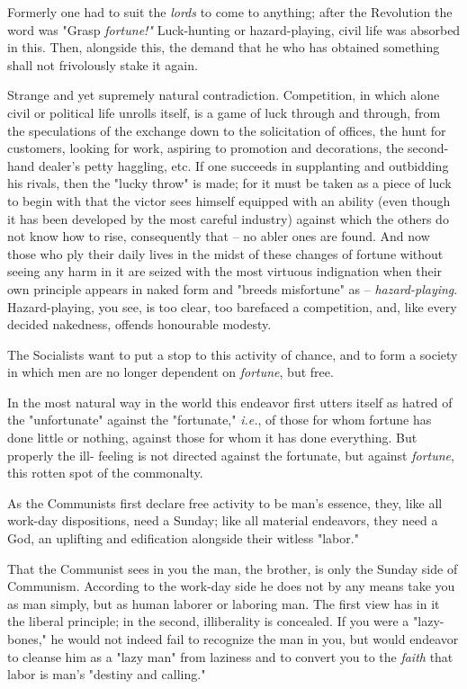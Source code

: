 Formerly one had to suit the \textit{lords} to come to anything; after the 
Revolution the word was "{}Grasp \textit{fortune!"{}} Luck-hunting or 
hazard-playing, civil life was absorbed in this. Then, alongside this, the 
demand that he who has obtained something shall not frivolously stake it 
again.

Strange and yet supremely natural contradiction. Competition, in which alone 
civil or political life unrolls itself, is a game of luck through and through, 
from the speculations of the exchange down to the solicitation of offices, the 
hunt for customers, looking for work, aspiring to promotion and decorations, 
the second-hand dealer's petty haggling, etc. If one succeeds in supplanting 
and outbidding his rivals, then the "{}lucky throw"{} is made; for it must be 
taken as a piece of luck to begin with that the victor sees himself equipped 
with an ability (even though it has been developed by the most careful 
industry) against which the others do not know how to rise, consequently that 
-- no abler ones are found. And now those who ply their daily lives in the 
midst of these changes of fortune without seeing any harm in it are seized 
with the most virtuous indignation when their own principle appears in naked 
form and "{}breeds misfortune"{} as -- \textit{hazard-playing}. 
Hazard-playing, you see, is too clear, too barefaced a competition, and, like 
every decided nakedness, offends honourable modesty.

The Socialists want to put a stop to this activity of chance, and to form a 
society in which men are no longer dependent on \textit{fortune}, but free.

In the most natural way in the world this endeavor first utters itself as 
hatred of the "{}unfortunate"{} against the "{}fortunate,"{} \textit{i.e.}, of 
those for whom fortune has done little or nothing, against those for whom it 
has done everything. But properly the ill- feeling is not directed against the 
fortunate, but against \textit{fortune}, this rotten spot of the commonalty.

As the Communists first declare free activity to be man's essence, they, like 
all work-day dispositions, need a Sunday; like all material endeavors, they 
need a God, an uplifting and edification alongside their witless "{}labor."{}

That the Communist sees in you the man, the brother, is only the Sunday side 
of Communism. According to the work-day side he does not by any means take you 
as man simply, but as human laborer or laboring man. The first view has in it 
the liberal principle; in the second, illiberality is concealed. If you were a 
"{}lazy-bones,"{} he would not indeed fail to recognize the man in you, but 
would endeavor to cleanse him as a "{}lazy man"{} from laziness and to convert 
you to the \textit{faith} that labor is man's "{}destiny and calling."{}

